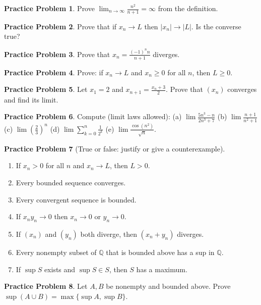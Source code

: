 \documentclass[11pt]{article}
\theoremstyle{definition}
\newtheorem{prob}{Practice Problem}
\newcommand{\Q}{\mathbb{Q}}
\begin{document}
\begin{prob}
Prove $\displaystyle\lim_{n\to\infty}\frac{n^2}{n+1}=\infty$ from the
definition.
\end{prob}

\begin{prob}
Prove that if $x_n\to L$ then $|x_n|\to|L|$. Is the converse true?
\end{prob}

\begin{prob}
Prove that $x_n=\frac{(-1)^n n}{n+1}$ diverges.
\end{prob}

\begin{prob}
Prove: if $x_n\to L$ and $x_n\ge 0$ for all $n$, then $L\ge0$.
\end{prob}

\begin{prob}
Let $x_1=2$ and $x_{n+1}=\frac{x_n+3}{2}$. Prove that $(x_n)$ converges and
find its limit.
\end{prob}

\begin{prob}
Compute (limit laws allowed):
(a) $\lim\frac{5n^3-n}{2n^3+7}$ \quad
(b) $\lim\frac{n+1}{n^2+1}$ \quad
(c) $\lim\left(\frac23\right)^n$ \quad
(d) $\lim\sum_{k=0}^n\frac1{2^k}$ \quad
(e) $\lim\frac{\cos(n^2)}{\sqrt n}$.
\end{prob}

\begin{prob}[True or false: justify or give a counterexample]\
\begin{enumerate}[label=(\alph*),nosep]
  \item If $x_n>0$ for all $n$ and $x_n\to L$, then $L>0$.
  \item Every bounded sequence converges.
  \item Every convergent sequence is bounded.
  \item If $x_ny_n\to0$ then $x_n\to0$ or $y_n\to0$.
  \item If $(x_n)$ and $(y_n)$ both diverge, then $(x_n+y_n)$ diverges.
  \item Every nonempty subset of $\Q$ that is bounded above has a sup in $\Q$.
  \item If $\sup S$ exists and $\sup S\in S$, then $S$ has a maximum.
\end{enumerate}
\end{prob}

\begin{prob}
Let $A,B$ be nonempty and bounded above. Prove
$\sup(A\cup B)=\max\{\sup A,\sup B\}$.
\end{prob}
\end{document}

